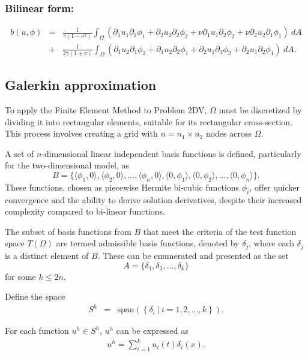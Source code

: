\subsubsection*{Bilinear form:}
\begin{align}
	b(u,\phi) & = & \frac{1}{\gamma(1-\nu^2)}\int_{\Omega} (\partial_1 u_1 \partial_1 \phi_1 + \partial_2 u_2 \partial _2 \phi_2 + \nu\partial_1 u_1 \partial_2\phi_2 + \nu \partial_2 u_2 \partial_1 \phi_1 ) \ dA \nonumber\\
	& + & \frac{1}{2\gamma(1+\nu)}\int_{\Omega} (\partial_1 u_2 \partial_1 \phi_2 + \partial_1 u_2 \partial_2 \phi_1 + \partial_2 u_1 \partial_1\phi_2 + \partial_2 u_1 \partial_2\phi_1) \ dA.
\end{align}



\subsection*{Galerkin approximation}\label{2d_FEM_G}
To apply the Finite Element Method to Problem 2DV, $\Omega$ must be discretized by dividing it into rectangular elements, suitable for its rectangular cross-section. This process involves creating a grid with $n = n_1 \times n_2$ nodes across $\Omega$.

A set of $n$-dimensional linear independent basis functions is defined, particularly for the two-dimensional model, as 
$$B = \{\langle\phi_1, 0\rangle, \langle\phi_2, 0\rangle,...,\langle\phi_{n}, 0 \rangle,\langle 0,\phi_1\rangle,\langle 0 ,\phi_2\rangle,...,\langle 0,\phi_{n}\rangle \}.$$ 
These functions, chosen as piecewise Hermite bi-cubic functions $\phi_i$, offer quicker convergence and the ability to derive solution derivatives, despite their increased complexity compared to bi-linear functions.

The subset of basis functions from $B$ that meet the criteria of the test function space $T(\Omega)$ are termed admissible basis functions, denoted by $\delta_j$, where each $\delta_j$ is a distinct element of $B$. These can be enumerated and presented as the set 
$$A = \{\delta_1, \delta_2,..., \delta_k \}$$ 
for some $k \leq 2n$.

Define the space
\begin{eqnarray*}
S^h & = & \textrm{span}\left(\left\{\delta_i \ | \ i = 1,2,...,k \right\} \right).
\end{eqnarray*}

For each function $u^h \in S^h$, $u^h$ can be expressed as
\begin{eqnarray*}
	u^h = \sum_{i = 1}^{k} u_i(t) \delta_{i}(x).
\end{eqnarray*}

